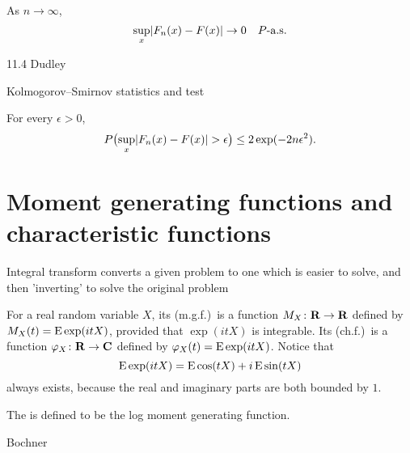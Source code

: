 \begin{namedthm}
    As $n \to \infty$, \[
        \sup_{x} \lvert F_n(x) - F(x) \rvert \to 0 \quad P\text{-a.s.}
    \]
\end{namedthm}

11.4 Dudley

Kolmogorov--Smirnov statistics and test

\begin{namedthm}
    For every $\epsilon > 0$, 
    \[P\bigl(\sup_{x} \lvert F_n(x) - F(x) \rvert > \epsilon\bigr) \leq 2\exp(-2n\epsilon^2).\]
\end{namedthm}

\section{Moment generating functions and characteristic functions}
Integral transform converts a given problem to one which is easier to solve, and then 'inverting' to solve the original problem

    For a real random variable $X$, its  (m.g.f.)\ is a function $M_X\colon \mathbf{R} \to \mathbf{R}$ defined by $M_X(t) = \mathop{}\!\mathrm{E} \exp(itX)$, provided that $\exp(itX)$ is integrable. Its  (ch.f.)\ is a function $\varphi_X\colon \mathbf{R} \to \mathbf{C}$ defined by $\varphi_X(t) = \mathop{}\!\mathrm{E}\exp(itX)$. Notice that \[
        \mathop{}\!\mathrm{E}\exp(itX) = \mathop{}\!\mathrm{E}\cos(tX) + i\mathop{}\!\mathrm{E}\sin(tX)
    \] always exists, because the real and imaginary parts are both bounded by $1$.

    The  is defined to be the log moment generating function.

    \cite[Theorem~7.13.1]{Bogachev_2007} Bochner

